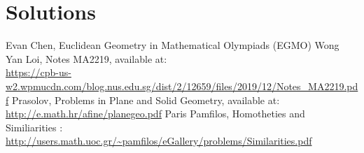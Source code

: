 \documentclass[11pt,twoside]{scrartcl}
\begin{document}
\begin{problem}
    \TBD
    \begin{sketch}
        \TBD 
    \end{sketch}
\end{problem}

\begin{problem}
    \TBD
    \begin{sketch}
        \TBD 
    \end{sketch}
\end{problem}


\clearpage
\section{Solutions}
\makehints

\clearpage

\begin{thebibliography}{99}
     Evan Chen, Euclidean Geometry in Mathematical Olympiads (EGMO)
     Wong Yan Loi, Notes MA2219, available at: \\ \url{https://cpb-us-w2.wpmucdn.com/blog.nus.edu.sg/dist/2/12659/files/2019/12/Notes_MA2219.pdf} 
     Prasolov, Problems in Plane and Solid Geometry, available at: \\ \url{http://e.math.hr/afine/planegeo.pdf}
	 Paris Pamfilos, Homotheties and Similiarities : \\ \url{http://users.math.uoc.gr/~pamfilos/eGallery/problems/Similarities.pdf}
\end{thebibliography}
\end{document}
